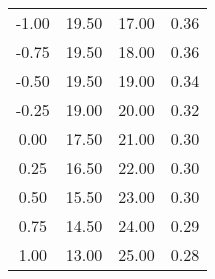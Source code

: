 \begin{table}[!htp]
\begin{tabular}{c c c c}
-1.00    & 19.50 &17.00    & 0.36 \\
-0.75    & 19.50 &18.00    & 0.36 \\
-0.50    & 19.50 &19.00    & 0.34 \\
-0.25    & 19.00 &20.00    & 0.32 \\
 0.00    & 17.50 &21.00    & 0.30 \\
 0.25    & 16.50 &22.00    & 0.30 \\
 0.50    & 15.50 &23.00    & 0.30 \\
 0.75    & 14.50 &24.00    & 0.29 \\
 1.00    & 13.00 &25.00    & 0.28 \\









\bottomrule
\end{tabular}
\end{table}